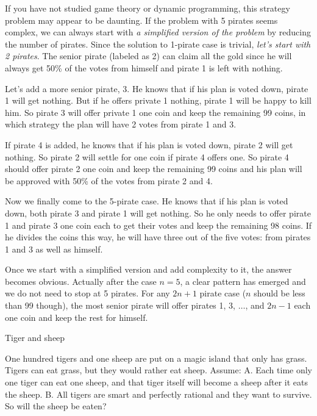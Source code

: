 \begin{solution}
If you have not studied game theory or dynamic programming, this strategy problem may
appear to be daunting. If the problem with 5 pirates seems complex, we can always start
with \emph{a simplified version of the problem} by reducing the number of pirates. Since the
solution to 1-pirate case is trivial, \emph{let's start with 2 pirates}. The senior
pirate (labeled as 2) can claim all the gold since he will always get 50\% of the votes
from himself and pirate 1 is left with nothing.

Let's add a more senior pirate, 3. He knows that if his plan is voted down, pirate 1 will get
nothing. But if he offers private 1 nothing, pirate 1 will be happy to kill him. So pirate 3
will offer private 1 one coin and keep the remaining 99 coins, in which strategy the plan
will have 2 votes from pirate 1 and 3.

If pirate 4 is added, he knows that if his plan is voted down, pirate 2 will get nothing. So
pirate 2 will settle for one coin if pirate 4 offers one. So pirate 4 should offer pirate 2 one
coin and keep the remaining 99 coins and his plan will be approved with 50\% of the votes
from pirate 2 and 4.

Now we finally come to the 5-pirate case. He knows that if his plan is voted down, both
pirate 3 and pirate 1 will get nothing. So he only needs to offer pirate 1 and pirate 3 one
coin each to get their votes and keep the remaining 98 coins. If he divides the coins this
way, he will have three out of the five votes: from pirates 1 and 3 as well as himself.

Once we start with a simplified version and add complexity to it, the answer becomes
obvious. Actually after the case $n=5$, a clear pattern has emerged and we do not need to
stop at 5 pirates. For any $2n+1$ pirate case ($n$ should be less than 99 though), the most
senior pirate will offer pirates 1, 3, $\ldots$, and $2n-1$ each one coin and keep the rest for
himself.
\end{solution}

\begin{problem}{Tiger and sheep}

One hundred tigers and one sheep are put on a magic island that only has grass. Tigers
can eat grass, but they would rather eat sheep. Assume: A. Each time only one tiger can
eat one sheep, and that tiger itself will become a sheep after it eats the sheep. B. All
tigers are smart and perfectly rational and they want to survive. So will the sheep be
eaten?
\end{problem}

